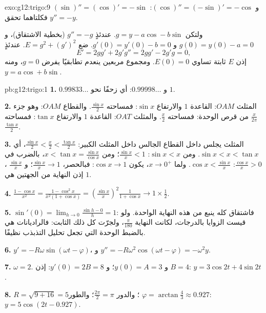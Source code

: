 \begin{solution}{exo:g12:trigo:9}
$(\sin)'' = (\cos)' = -\sin$ و $(\cos)'' = (-\sin)' = -\cos$: فكلتاهما تحقق
$y'' = -y$.

ولتكن $g = y - a\cos - b\sin$. عندئذٍ $g'' = -g$ (بخطية الاشتقاق)، و
$g(0) = y(0) - a = 0$ و $g'(0) = y'(0) - b = 0$. ضع
$E = g^2 + (g')^2$. عندئذٍ
\[
E' = 2g g' + 2g' g'' = 2g g' - 2g' g = 0,
\]
إذن $E$ ثابتة تساوي $E(0) = 0$. ومجموع مربعين ينعدم
تطابقيًا يفرض $g = 0$، ومنه $y = a\cos + b\sin$.
\end{solution}

\begin{solution}{pb:g12:trigo:1}
\textbf{1.} $0.99833\ldots$ و $0.99998\ldots$: أي زحفًا نحو
$1$.

\textbf{2.} المثلث $OAM$: القاعدة $1$ والارتفاع $\sin x$: فمساحته
$\frac{\sin x}{2}$. والقطاع $OAM$: وهو جزء
$\frac{x}{2\pi}$ من قرص الوحدة: فمساحته $\frac x2$. والمثلث
$OAT$: القاعدة $1$ والارتفاع $\tan x$: فمساحته $\frac{\tan x}{2}$.

\textbf{3.} المثلث يجلس داخل القطاع الجالس داخل المثلث
الكبير: $\frac{\sin x}{2} < \frac x2 < \frac{\tan x}{2}$،
أي $\sin x < x < \tan x$. ومن $\sin x < x$:
$\frac{\sin x}{x} < 1$؛ ومن
$x < \tan x = \frac{\sin x}{\cos x}$، بالضرب في
$\frac{\cos x}{x} > 0$: $\cos x < \frac{\sin x}{x}$. ولما
$x \to 0^+$، يكون $\cos x \to 1$: فبالحصر،
$\frac{\sin x}{x} \to 1$؛ و $\frac{\sin x}{x}$ ، إذن
النهاية من الجهتين هي $1$.

\textbf{4.} $\frac{1 - \cos x}{x^2} =
\frac{1 - \cos^2 x}{x^2 (1 + \cos x)} =
\left(\frac{\sin x}{x}\right)^2 \frac{1}{1 + \cos x}
\to 1 \times \frac12$.

\textbf{5.} $\sin'(0) = \lim_{h \to 0} \frac{\sin h - 0}{h} =
1$: فاشتقاق   كله ينبع من
هذه النهاية الواحدة. ولو قيست الزوايا بالدرجات، لكانت النهاية
$\frac{\pi}{180}$، ولجرّت كل  ذلك
الثابت: فالراديانات هي بالضبط الوحدة التي تجعل تحليل
التذبذب نظيفًا.

\textbf{6.} $y' = -R\omega\sin(\omega t - \varphi)$، و
$y'' = -R\omega^2\cos(\omega t - \varphi) = -\omega^2 y$.

\textbf{7.} $\omega = 2$. و $y(0) = A = 3$؛
و $y'(0) = 2B = 8$: إذن $B = 4$: $y = 3\cos 2t + 4\sin 2t$.

\textbf{8.} $R = \sqrt{9 + 16} = 5$؛ والدور
$\frac{2\pi}{2} = \pi$؛ والطور
$\varphi = \arctan\frac43 \approx 0.927$:
$y = 5\cos(2t - 0.927)$.


\end{solution}
